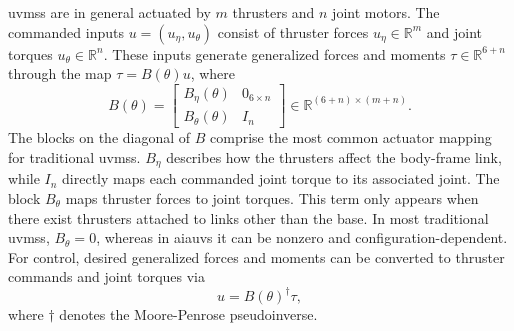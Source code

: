 \documentclass[../main.tex]{subfiles}
\begin{document}

\glspl{uvms} are in general actuated by \(m\) thrusters and \(n\) joint motors. The commanded inputs \(u=(u_\eta, u_\theta)\) consist of thruster forces \(u_\eta \in \mathbb{R}^m\) and joint torques \(u_\theta \in \mathbb{R}^n\). These inputs generate generalized forces and moments \(\tau \in \mathbb{R}^{6+n}\) through the map \(\tau = B(\theta)u\), where
\begin{equation}
B(\theta)=\begin{bmatrix}
B_{\eta}(\theta) & 0_{6\times n}\\[2pt]
B_{\theta}(\theta) & I_{n}
\end{bmatrix}
\in \mathbb{R}^{(6+n)\times(m+n)}.
\label{eq:alloc}
\end{equation}
The blocks on the diagonal of \( B \) comprise the most common actuator mapping for traditional \glspl{uvms}. \( B_\eta \) describes how the thrusters affect the body-frame link, while \( I_n \) directly maps each commanded joint torque to its associated joint. The block \( B_\theta \) maps thruster forces to joint torques. This term only appears when there exist thrusters attached to links other than the base. %
In most traditional \glspl{uvms}, \( B_\theta = 0 \), whereas in \glspl{aiauv} it can be nonzero and configuration-dependent. For control, desired generalized forces and moments can be converted to thruster commands and joint torques via
\begin{equation}
    u = B(\theta)^\dagger \tau,
\end{equation}
where \( \dagger \) denotes the Moore-Penrose pseudoinverse.
\end{document}
